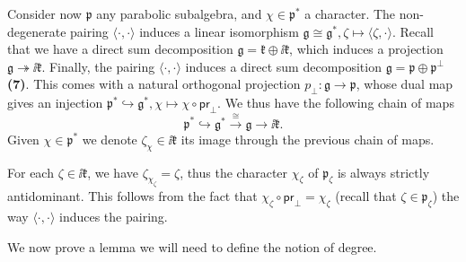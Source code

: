 {Consider now \(\mathfrak{p}\) any parabolic subalgebra, and \(\chi\in \mathfrak{p}^*\) a character. The non-degenerate pairing \(\langle \cdot, \cdot \rangle\) induces a linear isomorphism \(\mathfrak{g}\cong \mathfrak{g}^*, \zeta \mapsto \langle \zeta, \cdot \rangle\). Recall that we have a direct sum decomposition \(\mathfrak{g}=\mathfrak{k}\oplus \ii \mathfrak{k}\), which induces a projection \(\mathfrak{g} \twoheadrightarrow \ii \mathfrak{k}\). Finally, the pairing \(\langle \cdot , \cdot \rangle\) induces a direct sum decomposition \(\mathfrak{g}=\mathfrak{p}\oplus \mathfrak{p}^\perp\) \textbf{(7)}. This comes with a natural orthogonal projection \(p_\perp \colon \mathfrak{g}\to \mathfrak{p}\), whose dual map gives an injection \(\mathfrak{p}^* \hookrightarrow \mathfrak{g}^*, \chi \mapsto \chi \circ \textsf{pr}_\perp \). We thus have the following chain of maps 
\[
\mathfrak{p}^* \hookrightarrow \mathfrak{g}^* \xrightarrow{\cong} \mathfrak{g} \to \ii \mathfrak{k}.
\]
Given \(\chi \in \mathfrak{p}^*\) we denote \(\zeta_\chi\in \ii \mathfrak{k}\) its image through the previous chain of maps.


\begin{obs} \label{obs_chis_antidominant}
    For each \(\zeta\in \ii \mathfrak{k}\), we have \(\zeta_{\chi_\zeta}=\zeta\), thus the character \(\chi_\zeta\) of \(\mathfrak{p}_\zeta\) is always strictly antidominant. This follows from the fact that \(\chi_\zeta \circ \textsf{pr}_\perp=\chi_\zeta\) (recall that \(\zeta \in \mathfrak{p}_\zeta\)) the way \(\langle \cdot, \cdot \rangle\) induces the pairing.
\end{obs}

We now prove a lemma we will need to define the notion of degree. 

}
